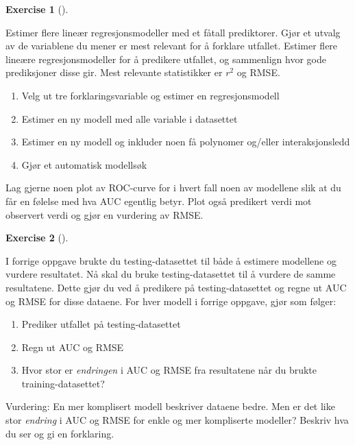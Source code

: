 \documentclass[
  letterpaper,
  DIV=11,
  numbers=noendperiod]{scrreprt}
\providecommand{\tightlist}{%
  \setlength{\itemsep}{0pt}\setlength{\parskip}{0pt}}\usepackage{longtable,booktabs,array}
\theoremstyle{definition}
\newtheorem{exercise}{Exercise}[chapter]
\theoremstyle{remark}
\begin{document}
\leavevmode{}%
\begin{exercise}[]\label{exr-ols-train}

Estimer flere lineær regresjonsmodeller med et fåtall prediktorer. Gjør
et utvalg av de variablene du mener er mest relevant for å forklare
utfallet. Estimer flere lineære regresjonsmodeller for å predikere
utfallet, og sammenlign hvor gode prediksjoner disse gir. Mest relevante
statistikker er \(r^2\) og RMSE.

\begin{enumerate}
\def\labelenumi{\alph{enumi})}
\tightlist
\item
  Velg ut tre forklaringsvariable og estimer en regresjonsmodell
\item
  Estimer en ny modell med alle variable i datasettet
\item
  Estimer en ny modell og inkluder noen få polynomer og/eller
  interaksjonsledd
\item
  Gjør et automatisk modellsøk
\end{enumerate}

Lag gjerne noen plot av ROC-curve for i hvert fall noen av modellene
slik at du får en følelse med hva AUC egentlig betyr. Plot også
predikert verdi mot observert verdi og gjør en vurdering av RMSE.

\end{exercise}

\leavevmode{}%
\begin{exercise}[]\label{exr-ols-test}

I forrige oppgave brukte du testing-datasettet til både å estimere
modellene og vurdere resultatet. Nå skal du bruke testing-datasettet til
å vurdere de samme resultatene. Dette gjør du ved å predikere på
testing-datasettet og regne ut AUC og RMSE for disse dataene. For hver
modell i forrige oppgave, gjør som følger:

\begin{enumerate}
\def\labelenumi{\alph{enumi})}
\tightlist
\item
  Prediker utfallet på testing-datasettet
\item
  Regn ut AUC og RMSE
\item
  Hvor stor er \emph{endringen} i AUC og RMSE fra resultatene når du
  brukte training-datasettet?
\end{enumerate}

Vurdering: En mer komplisert modell beskriver dataene bedre. Men er det
like stor \emph{endring} i AUC og RMSE for enkle og mer kompliserte
modeller? Beskriv hva du ser og gi en forklaring.

\end{exercise}
\end{document}
